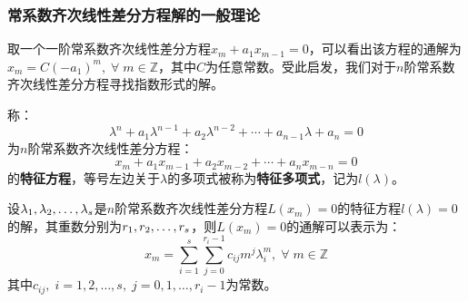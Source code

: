\subsubsection{常系数齐次线性差分方程解的一般理论}
\begin{derivation}
	取一个一阶常系数齐次线性差分方程$x_m+a_1x_{m-1}=0$，可以看出该方程的通解为$x_m=C(-a_1)^m,\;\forall\;m\in\mathbb{Z}$，其中$C$为任意常数。受此启发，我们对于$n$阶常系数齐次线性差分方程寻找指数形式的解。
\end{derivation}
\begin{definition}
	称：
	\begin{equation*}
		\lambda^n+a_1\lambda^{n-1}+a_2\lambda^{n-2}+\cdots+a_{n-1}\lambda+a_n=0
	\end{equation*}
	为$n$阶常系数齐次线性差分方程：
	\begin{equation*}
		x_m+a_1x_{m-1}+a_2x_{m-2}+\cdots+a_nx_{m-n}=0
	\end{equation*}
	的\textbf{特征方程}，等号左边关于$\lambda$的多项式被称为\textbf{特征多项式}，记为$l(\lambda)$。
\end{definition}
\begin{theorem}\label{theo:GeneralSolutionHomogeneousLinearDifferenceEqConstantCoefficients}
	设$\lambda_1, \lambda_2, \dots, \lambda_{s}$是$n$阶常系数齐次线性差分方程$L(x_m)=0$的特征方程$l(\lambda)=0$的解，其重数分别为$r_1, r_2, \dots, r_{s}$，则$L(x_m)=0$的通解可以表示为：
	\begin{equation*}
		x_m=\sum_{i=1}^{s}\sum_{j=0}^{r_i-1}c_{ij}m^{j}\lambda_i^m,\;\forall\;m\in\mathbb{Z}
	\end{equation*}
	其中$c_{ij},\;i=1,2,\dots,s,\;j=0,1,\dots,r_i-1$为常数。
\end{theorem}
